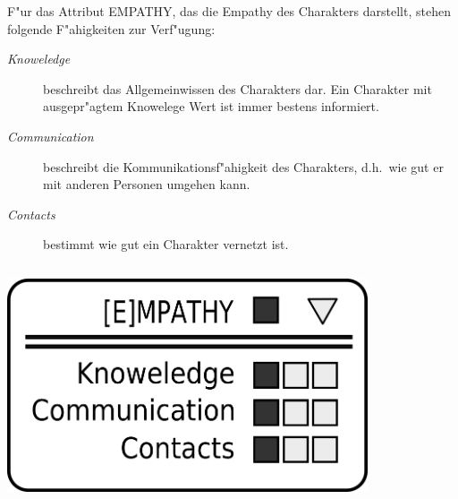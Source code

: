 \begin{column}[l]{0.55}
    F"ur das Attribut EMPATHY, das die Empathy des Charakters darstellt, stehen folgende F"ahigkeiten zur Verf"ugung:

    \begin{description}
        \item[\emph{Knoweledge}] beschreibt das Allgemeinwissen des Charakters dar. Ein Charakter mit ausgepr"agtem Knowelege Wert ist 
            immer bestens informiert.
        \item[\emph{Communication}] beschreibt die Kommunikationsf"ahigkeit des Charakters, d.h.~wie gut er mit anderen Personen umgehen 
            kann.
        \item[\emph{Contacts}] bestimmt wie gut ein Charakter vernetzt ist.
    \end{description}
\end{column}
\begin{column}[r]{0.45}
    \centering
    \includegraphics[width=0.80\textwidth]{images/character_empathy.png}
\end{column}

